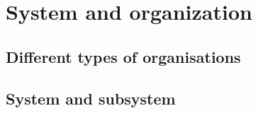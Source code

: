 \chapter{System and organization}

\section{Different types of organisations}


\section{System and subsystem}




